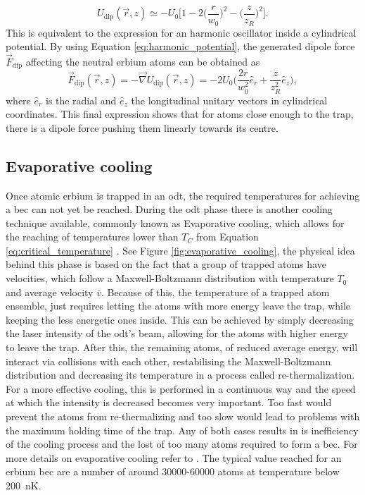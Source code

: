 \begin{equation}\label{eq:harmonic_potential}
	U_{\text{dip}}(\vec{r}, z) \simeq  -U_0 \bigg[1-2\bigg(\frac{r}{w_0}\bigg)^2-\bigg(\frac{z}{z_R}\bigg)^2\bigg].
\end{equation}
This is equivalent to the expression for an harmonic oscillator inside a cylindrical potential. By using Equation \eqref{eq:harmonic_potential}, the generated dipole force $\vec{F}_{\text{dip}}$ affecting the neutral erbium atoms can be obtained as
\begin{equation}
	\vec{F}_{\text{dip}}(\vec{r}, z) = -\vec{\nabla}{U_{\text{dip}}(\vec{r}, z)}= -2U_0\bigg(\frac{2 r}{w_0^2}\hat{e}_r + \frac{z}{z_R^2}\hat{e}_z\bigg),
\end{equation}
where $\hat{e}_r$ is the radial and $\hat{e}_z$ the longitudinal unitary vectors in cylindrical coordinates. This final expression shows that for atoms close enough to the trap, there is a dipole force pushing them linearly towards its centre.

\subsection{Evaporative cooling}

Once atomic erbium is trapped in an \ac{odt}, the required temperatures for achieving a \ac{bec} can not yet be reached. During the \acl{odt} phase there is another cooling technique available, commonly known as Evaporative cooling, which allows for the reaching of temperatures lower than $T_C$ from Equation \eqref{eq:critical_temperature} \cite{Masuhara1988}. See Figure \ref{fig:evaporative_cooling}, the physical idea behind this phase is based on the fact that a group of trapped atoms have velocities, which follow a Maxwell-Boltzmann distribution with temperature $T_0$ and average velocity $\bar{v}$. Because of this, the temperature of a trapped atom ensemble, just requires letting the atoms with more energy leave the trap, while keeping the less energetic ones inside. This can be achieved by simply decreasing the laser intensity of the \ac{odt}'s beam, allowing for the atoms with higher energy to leave the trap. After this, the remaining atoms, of reduced average energy, will interact via collisions with each other, restabilising the Maxwell-Boltzmann distribution and decreasing its temperature in a process called re-thermalization. For a more effective cooling, this is performed in a continuous way and the speed at which the intensity is decreased becomes very important. Too fast would prevent the atoms from re-thermalizing and too slow would lead to problems with the maximum holding time of the trap. Any of both cases results in is inefficiency of the cooling process and the lost of too many atoms required to form a \ac{bec}. For more details on evaporative cooling refer to \cite{Ulitzsch2016, Metcalf1999, Roell2016}. The typical value reached for an erbium \ac{bec} are a number of around \num{30000}-\num{60000} atoms at temperature below \SI{200}{\nano\kelvin}.


